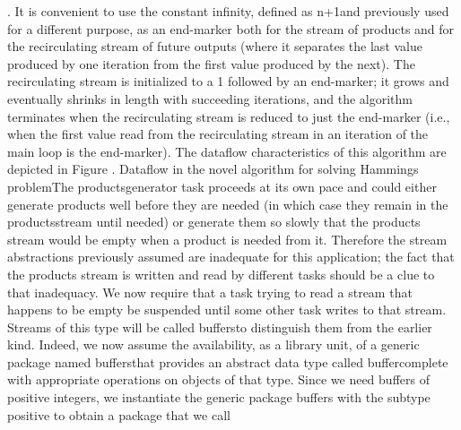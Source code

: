 \tyxffmxendmono[]. It is convenient to use the constant %
\tyxffmxmono[]infinity\tyxffmxendmono[], defined as %
\tyxffmxmono[]n+1\tyxffmxendmono[] and previously used for a different
purpose, as an end-marker both for the stream of products and for
the recirculating stream of future outputs (where it separates the
last value produced by one iteration from the first value produced
by the next). The recirculating stream is initialized to a 1 followed
by an end-marker; it grows and eventually shrinks in length with succeeding
iterations, and the algorithm terminates when the recirculating stream
is reduced to just the end-marker (i.e., when the first value read
from the recirculating stream in an iteration of the main loop is
the end-marker). The dataflow characteristics of this algorithm are
depicted in Figure .
Dataflow in the novel algorithm
for solving Hamming\rsquo[]s problem\FgEndcap[]
\PreProcFgGfx\FgGfx[\FgGfxHt=230.44pt \FgGfxWd=510.85pt \def\FgGfxPath{salishan.try12.book}\def\FgGfxCache{salishan.try12.book}\FgGfxX=0.00pt \FgGfxY=0.00pt \def\FgGfxProc{PubDraw}\FgGfxMag=80 \def\FgGfxFilename{data-flow.vec}]
\FgEndblock[]
\Endpara[]
\Para[] The \tyxffmxmono[]products\Symuns[]generator%
\tyxffmxendmono[] task proceeds at its own pace and could either generate
products well before they are needed (in which case they remain in
the \tyxffmxmono[]products\tyxffmxendmono[] stream until needed) or
generate them so slowly that the \tyxffmxmono[]products%
\tyxffmxendmono[] stream would be empty when a product is needed from
it. Therefore the stream abstractions previously assumed are inadequate
for this application; the fact that the \tyxffmxmono[]products%
\tyxffmxendmono[] stream is written and read by different tasks should
be a clue to that inadequacy. We now require that a task trying to
read a stream that happens to be empty be suspended until some other
task writes to that stream. Streams of this type will be called \ldquo[]buffers\rdquo[]
to distinguish them from the earlier kind. Indeed, we now assume the
availability, as a library unit, of a generic package named %
\tyxffmxmono[]buffers\tyxffmxendmono[] that provides an abstract data
type called \tyxffmxmono[]buffer\tyxffmxendmono[] complete with appropriate
operations on objects of that type. Since we need buffers of positive
integers, we instantiate the generic package \tyxffmxmono[]buffers%
\tyxffmxendmono[] with the subtype \tyxffmxmono[]positive%
\tyxffmxendmono[] to obtain a package that we call %
